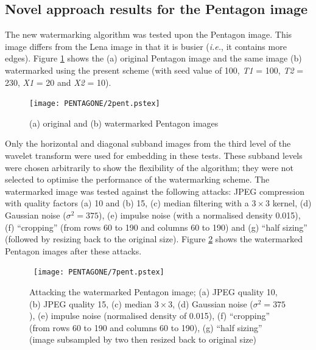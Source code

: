 \documentclass[12pt]{report}
\begin{document}
\subsection{Novel approach results for the Pentagon image}
The new watermarking algorithm was tested upon the Pentagon image. 
This image differs from the Lena image in that it is busier (\emph{i.e.}, it contains more edges).
Figure \ref{pentagonOrWmDI} shows the (a) original Pentagon image and the same image (b) watermarked
using the present scheme (with seed value of 100, \emph{T1} = 100, \emph{T2} = 230, \emph{X1} = 20 and
\emph{X2} = 10). 
\begin{figure}[p]
	\begin{center}
		\texttt{[image: PENTAGONE/2pent.pstex]}
		\caption{(a) original and (b) watermarked Pentagon images}
		\label{pentagonOrWmDI}
	\end{center}
\end{figure}
Only the horizontal and diagonal subband images from the third level of the 
wavelet transform were used for embedding in these tests. These subband levels were chosen arbitrarily
to show the flexibility of the algorithm; they were not selected to optimise the performance of the
watermarking scheme.
The watermarked image was tested against the following attacks:
JPEG compression with quality factors (a) 10 and (b) 15, (c) median filtering with a $3 \times 3$ kernel,
(d) Gaussian noise ($\sigma^{2} = 375$), (e) impulse noise (with a normalised density 0.015), 
(f) ``cropping'' (from rows 60 to 190 and columns 60 to 190)
and (g) ``half sizing'' (followed by resizing back to the original size).
Figure \ref{allAttacksPentDI} shows the watermarked Pentagon images after these attacks.
\begin{figure}[p]
\setlength{\abovecaptionskip}{-0.1cm}
	\centerline{ \hbox{
		\texttt{[image: PENTAGONE/7pent.pstex]}
		}}
		\caption{Attacking the watermarked Pentagon image; (a) JPEG quality 10,
		(b) JPEG quality 15, (c) median $3\times3$, (d) Gaussian noise ($\sigma^{2}=375$), 
		(e) impulse noise (normalised density of 0.015),
		(f) ``cropping'' (from rows 60 to 190 and columns 60 to 190), (g) ``half sizing''
		(image subsampled by two then resized back to original size)}
		\label{allAttacksPentDI}
\end{figure}
\end{document}
